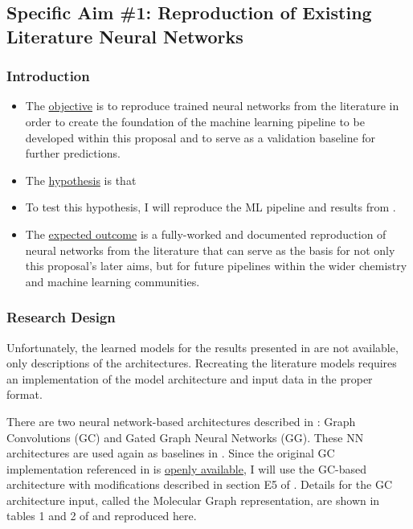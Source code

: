 \documentclass[12pt]{article}
\begin{document}
\subsection{Specific Aim \#1: Reproduction of Existing Literature Neural Networks}
\label{sec:org5054716}

\subsubsection{Introduction}
\label{sec:org44d8d2c}

\begin{itemize}
\item The \uline{objective} is to reproduce trained neural networks from the literature in order to create the foundation of the machine learning pipeline to be developed within this proposal and to serve as a validation baseline for further predictions.

\item The \uline{hypothesis} is that 

\item To test this hypothesis, I will reproduce the ML pipeline and results from \parencite{2017arXiv170205532F}.

\item The \uline{expected outcome} is a fully-worked and documented reproduction of neural networks from the literature that can serve as the basis for not only this proposal's later aims, but for future pipelines within the wider chemistry and machine learning communities.
\end{itemize}

\subsubsection{Research Design}
\label{sec:orga12f573}

Unfortunately, the learned models for the results presented in \parencite{2017arXiv170205532F} are not available, only descriptions of the architectures. Recreating the literature models requires an implementation of the model architecture and input data in the proper format.

There are two neural network-based architectures described in \parencite{2017arXiv170205532F}: Graph Convolutions \cite{Kearnes2016} (GC) and Gated Graph Neural Networks \cite{2015arXiv151105493L} (GG). These NN architectures are used again as baselines in \parencite{2017arXiv170401212G}. Since the original GC implementation referenced in \parencite{2017arXiv170205532F} is \href{https://github.com/tkipf/gcn}{openly available}\cite{kipf2016semi}, I will use the GC-based architecture with modifications described in section E5 of \parencite{2017arXiv170205532F}.  Details for the GC architecture input, called the Molecular Graph representation, are shown in tables 1 and 2 of \parencite{2017arXiv170205532F} and reproduced here.
\end{document}
